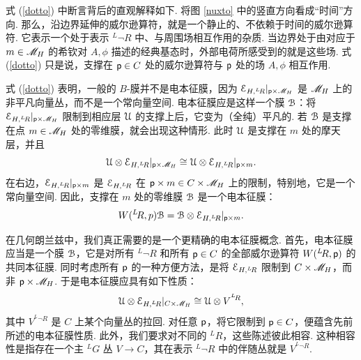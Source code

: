 式 (\ref{dotto}) 中断言背后的直观解释如下. 将图 \ref{nuxto} 中的竖直方向看成“时间”方向. 那么，沿边界延伸的威尔逊算符，就是一个静止的、不依赖于时间的威尔逊算符. 它表示一个处于表示 $^L\neg R$ 中、与周围场相互作用的杂质. 当边界处于由对应于 $m\in{{\mathscr{M}}_H}$ 的希钦对 $A,\phi$ 描述的经典基态时，外部电荷所感受到的就是这些场. 式 (\ref{dotto}) 只是说，支撑在 ${\sf p}\in C$ 处的威尔逊算符与 ${\sf p}$ 处的场 $A,\phi$ 相互作用.

式 (\ref{dotto}) 表明，一般的 $B$-膜并不是电本征膜，因为 ${\mathcal E}_{H,^L\negthinspace R}|_{{\sf p}\times
{{\mathscr{M}}_H}}$ 是 ${{\mathscr{M}}_H}$ 上的非平凡向量丛，而不是一个常向量空间. 电本征膜应是这样一个膜 ${\mathcal B}$：将 ${\mathcal E}_{H,^L\negthinspace R}|_{{\sf p}\times
{{\mathscr{M}}_H}}$ 限制到相应层 ${\mathcal U}$ 的支撑上后，它变为（全纯）平凡的. 若 ${\mathcal B}$ 是支撑在点 $m\in{{\mathscr{M}}_H}$ 处的零维膜，就会出现这种情形. 此时 ${\mathcal U}$ 是支撑在 $m$ 处的摩天层，并且
\begin{equation}{\mathcal U}\otimes  {\mathcal E}_{H,^L\negthinspace R}|_{{\sf p}\times
{{\mathscr{M}}_H}}\cong {\mathcal U}\otimes  {\mathcal E}_{H,^L\negthinspace R}|_{{\sf p}\times m}.   \end{equation} 
在右边，$ {\mathcal E}_{H,^L\negthinspace R}|_{{\sf p}\times m}$ 是 ${\mathcal E}_{H,^L\negthinspace R}$ 在 ${\sf p}\times m\in
C\times {{\mathscr{M}}_H}$ 上的限制，特别地，它是一个常向量空间.
因此，支撑在 $m$ 处的零维膜 ${\mathcal B}$ 是一个电本征膜：
\begin{equation}\label{zefor} W(^L\negthinspace R,p){\mathcal B}={\mathcal B}\otimes  {\mathcal E}_{H,^L\negthinspace R}|_{{\sf p}\times m}. \end{equation}

在几何朗兰兹中，我们真正需要的是一个更精确的电本征膜概念. 首先，电本征膜应当是一个膜 ${\mathcal B}$，它是对所有 $^L\neg R$ 和所有 ${\sf p}\in C$ 的全部威尔逊算符 $W(^L\negthinspace R,{\sf p})$ 的共同本征膜.
同时考虑所有 ${\sf p}$ 的一种方便方法，是将 ${\mathcal E}_{H,^L\negthinspace R}$ 限制到 $C\times {{\mathscr{M}}_H}$，而非 ${\sf p} \times {{\mathscr{M}}_H}$. 于是电本征膜应具有如下性质：
\begin{equation}\label{turnof} {\mathcal U}\otimes  {\mathcal E}_{H,^L\negthinspace R}|_{C\times
{{\mathscr{M}}_H}}\cong {\mathcal U}\otimes  V^{^L\negthinspace R},   \end{equation} 
其中 $V^{^L\neg R}$ 是 $C$ 上某个向量丛的拉回. 对任意 ${\sf p}$，将它限制到 ${\sf p}\in C$，便蕴含先前所述的电本征膜性质. 此外，我们要求对不同的 $^LR$，这些陈述彼此相容. 这种相容性是指存在一个主 $^LG$ 丛 $V\to C$，其在表示 $^L\neg R$ 中的伴随丛就是 $V^{^L\neg R}$.

